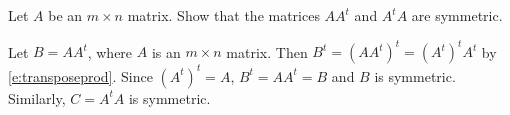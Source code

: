 \documentclass{ximera}
\begin{document}
\begin{exercise} \label{c4.7.2.2}
Let $A$ be an $m\times n$ matrix.  Show that the matrices $A A^t$ and
$A^t A$ are symmetric.

\begin{solution}
\soln 
Let $B = AA^t$, where $A$ is an $m \times n$ matrix.
Then $B^t = (AA^t)^t = (A^t)^tA^t$ by \eqref{e:transposeprod}.  Since
$(A^t)^t=A$, $B^t=AA^t=B$ and $B$ is symmetric.  Similarly, $C = A^tA$
is symmetric.

\end{solution}
\end{exercise}
\end{document}
